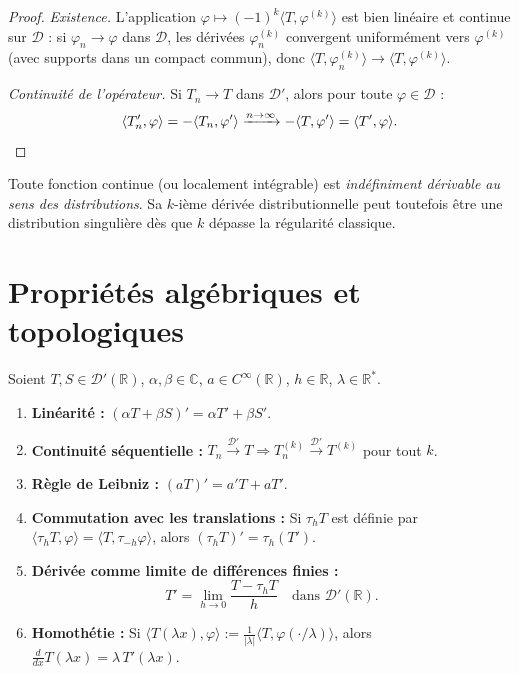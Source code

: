 \documentclass[12pt,a4paper,openany]{book}
\theoremstyle{definition}
\theoremstyle{plain}
\theoremstyle{remark}
\begin{document}
	\begin{proof}
		\emph{Existence.} L'application $\varphi \mapsto (-1)^k\langle T, \varphi^{(k)}\rangle$ est bien linéaire et continue sur $\mathcal{D}$ : si $\varphi_n \to \varphi$ dans $\mathcal{D}$, les dérivées $\varphi_n^{(k)}$ convergent uniformément vers $\varphi^{(k)}$ (avec supports dans un compact commun), donc $\langle T, \varphi_n^{(k)}\rangle \to \langle T, \varphi^{(k)}\rangle$.
		
		\emph{Continuité de l'opérateur.} Si $T_n \to T$ dans $\mathcal{D}'$, alors pour toute $\varphi \in \mathcal{D}$ :
		\[
		\langle T_n', \varphi \rangle = -\langle T_n, \varphi' \rangle \xrightarrow{n\to\infty} -\langle T, \varphi' \rangle = \langle T', \varphi \rangle. \qedhere
		\]
	\end{proof}
	
	\begin{corollary}
		Toute fonction continue (ou localement intégrable) est \emph{indéfiniment dérivable au sens des distributions}. Sa $k$-ième dérivée distributionnelle peut toutefois être une distribution singulière dès que $k$ dépasse la régularité classique.
	\end{corollary}
	
	\section{Propriétés algébriques et topologiques}
	
	\begin{proposition}
		Soient $T, S \in \mathcal{D}'(\mathbb{R})$, $\alpha, \beta \in \mathbb{C}$, $a \in C^\infty(\mathbb{R})$, $h \in \mathbb{R}$, $\lambda \in \mathbb{R}^*$.
		\begin{enumerate}
			\item \textbf{Linéarité :} $(\alpha T + \beta S)' = \alpha T' + \beta S'$.
			\item \textbf{Continuité séquentielle :} $T_n \xrightarrow{\mathcal{D}'} T \Rightarrow T_n^{(k)} \xrightarrow{\mathcal{D}'} T^{(k)}$ pour tout $k$.
			\item \textbf{Règle de Leibniz :} $(aT)' = a'T + aT'$.
			\item \textbf{Commutation avec les translations :} Si $\tau_h T$ est définie par $\langle \tau_h T, \varphi\rangle = \langle T, \tau_{-h}\varphi\rangle$, alors $(\tau_h T)' = \tau_h(T')$.
			\item \textbf{Dérivée comme limite de différences finies :}
			\[
			T' = \lim_{h\to 0} \frac{T - \tau_h T}{h} \quad \text{dans } \mathcal{D}'(\mathbb{R}).
			\]
			\item \textbf{Homothétie :} Si $\langle T(\lambda x), \varphi\rangle := \frac{1}{|\lambda|}\langle T, \varphi(\cdot/\lambda)\rangle$, alors $\frac{d}{dx}T(\lambda x) = \lambda\,T'(\lambda x)$.
		\end{enumerate}
	\end{proposition}
	
\end{document}
